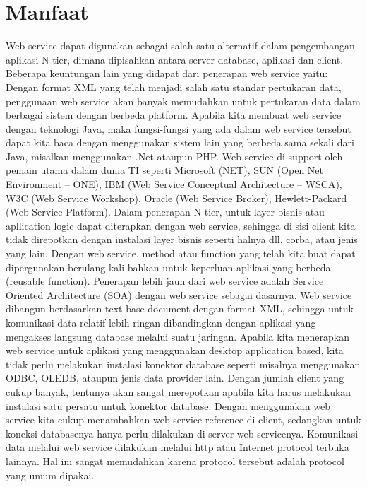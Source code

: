 \documentclass[a4paper,11pt]{book}
\begin{document}
\section*{Manfaat}
Web service dapat digunakan sebagai salah satu alternatif dalam pengembangan aplikasi  N-tier, dimana dipisahkan antara server database, aplikasi dan client. Beberapa keuntungan lain yang didapat dari penerapan web service yaitu:
Dengan format XML yang telah menjadi salah satu standar pertukaran data, penggunaan web service akan banyak memudahkan untuk pertukaran data dalam berbagai sistem dengan berbeda platform. Apabila kita membuat web service dengan teknologi Java, maka fungsi-fungsi yang ada dalam web service tersebut dapat kita baca dengan menggunakan sistem lain yang berbeda sama sekali dari Java, misalkan menggunakan .Net ataupun PHP.
Web service di support oleh pemain utama dalam dunia TI seperti Microsoft (NET), SUN (Open Net Environment  – ONE), IBM (Web Service Conceptual Architecture  – WSCA), W3C (Web Service Workshop), Oracle (Web Service Broker), Hewlett-Packard (Web Service Platform).
Dalam penerapan  N-tier, untuk layer bisnis atau  apllication logic  dapat diterapkan dengan web service, sehingga di sisi client kita tidak direpotkan dengan instalasi layer bisnis seperti  halnya  dll, corba, atau jenis  yang lain. Dengan web service,  method atau function yang telah kita buat dapat dipergunakan berulang kali bahkan untuk keperluan aplikasi yang  berbeda (reusable function). Penerapan lebih jauh dari web service adalah  Service Oriented Architecture (SOA) dengan web service sebagai dasarnya.
Web service dibangun berdasarkan  text base document dengan format XML, sehingga untuk komunikasi data relatif lebih ringan dibandingkan dengan aplikasi yang mengakses langsung database melalui suatu jaringan. Apabila kita menerapkan web service untuk aplikasi yang menggunakan  desktop application  based, kita tidak perlu melakukan instalasi konektor database seperti misalnya menggunakan ODBC, OLEDB, ataupun jenis  data provider lain. Dengan jumlah client yang cukup banyak, tentunya akan sangat merepotkan apabila kita harus melakukan instalasi satu persatu untuk konektor database. Dengan menggunakan web service kita cukup menambahkan  web service reference  di client, sedangkan untuk koneksi databasenya hanya perlu dilakukan di server web servicenya.
Komunikasi data melalui web service dilakukan melalui  http  atau  Internet protocol  terbuka lainnya. Hal ini sangat memudahkan karena  protocol tersebut adalah protocol yang umum dipakai.
\end{document}
